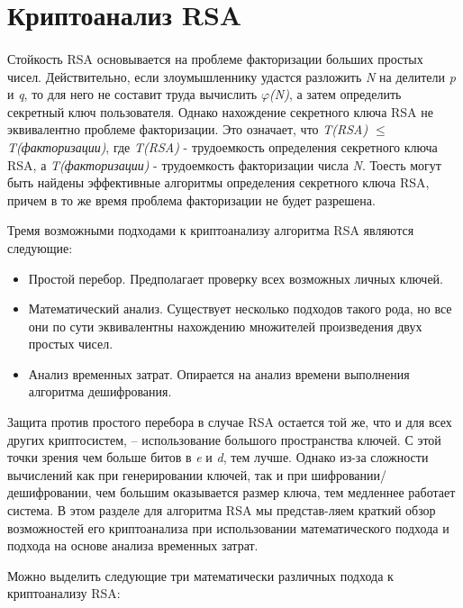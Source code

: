 \section{Криптоанализ RSA}

  \paragraph{} Стойкость RSA основывается на проблеме факторизации больших простых чисел. Действительно, если злоумышленнику удастся разложить
  \textit{N} на делители \textit{p} и \textit{q}, то для него не составит труда вычислить \textit{{$\varphi$}(N)}, а затем определить секретный ключ пользователя. 
  Однако нахождение секретного ключа RSA не эквивалентно проблеме факторизации. Это означает, что \textit{T(RSA) {$\le$} T(факторизации)}, 
  где \textit{T(RSA)} - трудоемкость определения секретного ключа RSA, а \textit{T(факторизации)} - трудоемкость факторизации числа \textit{N}. Тоесть 
  могут быть найдены эффективные алгоритмы определения секретного ключа RSA, причем в то же время проблема факторизации не будет разрешена.
  
  Тремя возможными подходами к криптоанализу алгоритма RSA являются следующие:
  
    \begin{itemize}
     \item Простой перебор. Предполагает проверку всех возможных личных ключей.
     \item Математический анализ. Существует несколько подходов такого рода, но все они по сути эквивалентны нахождению множителей произведения 
     двух простых чисел.
     \item Анализ временных затрат. Опирается на анализ времени выполнения алгоритма дешифрования.
    \end{itemize}
    
  Защита против простого перебора в случае RSA остается той же, что и для всех других криптосистем, – использование большого пространства 
  ключей. С этой точки зрения чем больше битов в \textit{e} и \textit{d}, тем лучше. Однако из-за сложности вычислений как при генерировании 
  ключей, так и при шифровании/дешифровании, чем большим оказывается размер ключа, тем медленнее работает система. В этом разделе для 
  алгоритма RSA мы представ-ляем краткий обзор возможностей его криптоанализа при использовании математического подхода и подхода на основе 
  анализа временных затрат.
  
  Можно выделить следующие три математически различных подхода к криптоанализу RSA:
  
